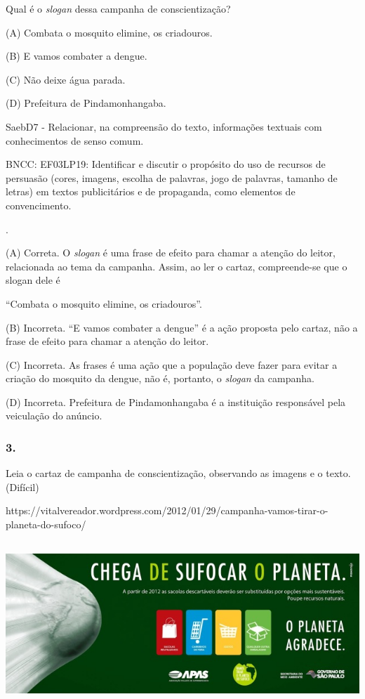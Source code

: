 Qual é o \emph{slogan} dessa campanha de conscientização?

(A) Combata o mosquito elimine, os criadouros.

(B) E vamos combater a dengue.

(C) Não deixe água parada.

(D) Prefeitura de Pindamonhangaba.

SaebD7 - Relacionar, na compreensão do texto, informações textuais com
conhecimentos de senso comum.

BNCC: EF03LP19: Identificar e discutir o propósito do uso de recursos de
persuasão (cores, imagens, escolha de palavras, jogo de palavras,
tamanho de letras) em textos publicitários e de propaganda, como
elementos de convencimento.

.

(A) Correta. O \emph{slogan} é uma frase de efeito para chamar a atenção
do leitor, relacionada ao tema da campanha. Assim, ao ler o cartaz,
compreende-se que o slogan dele é

``Combata o mosquito elimine, os criadouros''.

(B) Incorreta. ``E vamos combater a dengue'' é a ação proposta pelo
cartaz, não a frase de efeito para chamar a atenção do leitor.

(C) Incorreta. As frases é uma ação que a população deve fazer para
evitar a criação do mosquito da dengue, não é, portanto, o \emph{slogan}
da campanha.

(D) Incorreta. Prefeitura de Pindamonhangaba é a instituição responsável
pela veiculação do anúncio.

\subsubsection{3. }\label{section-46}

Leia o cartaz de campanha de conscientização, observando as imagens e o
texto. (Difícil)

https://vitalvereador.wordpress.com/2012/01/29/campanha-vamos-tirar-o-planeta-do-sufoco/

\includegraphics[width=6.14514in,height=2.43088in]{media/image14.jpeg}

